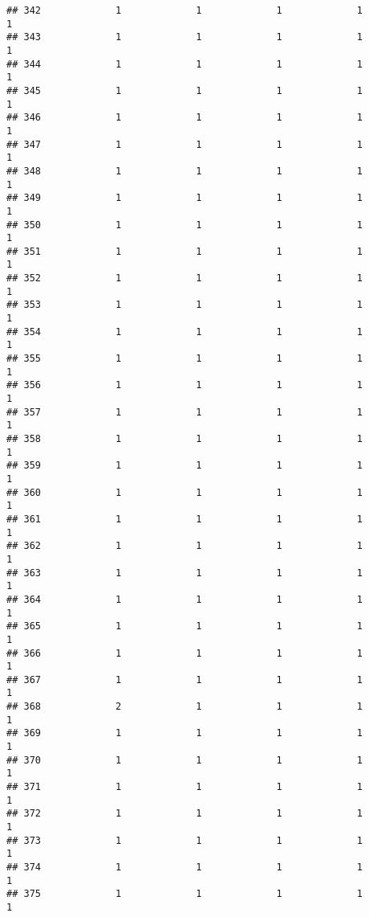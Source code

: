 \documentclass[
]{article}
\begin{document}
\begin{verbatim}
## 342             1             1             1             1             1
## 343             1             1             1             1             1
## 344             1             1             1             1             1
## 345             1             1             1             1             1
## 346             1             1             1             1             1
## 347             1             1             1             1             1
## 348             1             1             1             1             1
## 349             1             1             1             1             1
## 350             1             1             1             1             1
## 351             1             1             1             1             1
## 352             1             1             1             1             1
## 353             1             1             1             1             1
## 354             1             1             1             1             1
## 355             1             1             1             1             1
## 356             1             1             1             1             1
## 357             1             1             1             1             1
## 358             1             1             1             1             1
## 359             1             1             1             1             1
## 360             1             1             1             1             1
## 361             1             1             1             1             1
## 362             1             1             1             1             1
## 363             1             1             1             1             1
## 364             1             1             1             1             1
## 365             1             1             1             1             1
## 366             1             1             1             1             1
## 367             1             1             1             1             1
## 368             2             1             1             1             1
## 369             1             1             1             1             1
## 370             1             1             1             1             1
## 371             1             1             1             1             1
## 372             1             1             1             1             1
## 373             1             1             1             1             1
## 374             1             1             1             1             1
## 375             1             1             1             1             1

\end{verbatim}
\end{document}
